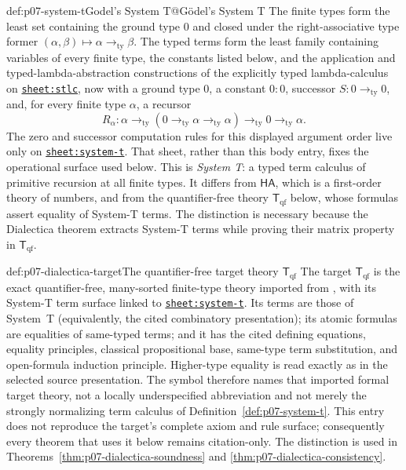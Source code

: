 \begin{hbdefinition}{def:p07-system-t}{Godel's System T@G\"odel's System T}
The finite types form the least set containing the ground type \(0\) and
closed under the right-associative type former
\((\alpha,\beta)\mapsto\alpha\to_{\mathrm{ty}}\beta\).  The typed terms form
the least family containing variables of every finite type, the constants
listed below, and the application and typed-lambda-abstraction constructions
of the explicitly typed lambda-calculus on
\hyperref[sheet:stlc]{\texttt{sheet:stlc}}, now with a ground type \(0\), a
constant \(0:0\), successor \(S:0\to_{\mathrm{ty}}0\), and, for every finite type
\(\alpha\), a recursor
\[
 R_\alpha:
 \alpha\to_{\mathrm{ty}}
 (0\to_{\mathrm{ty}}\alpha\to_{\mathrm{ty}}\alpha)
 \to_{\mathrm{ty}}0\to_{\mathrm{ty}}\alpha.
\]
The zero and successor computation rules for this displayed argument order
live only on \hyperref[sheet:system-t]{\texttt{sheet:system-t}}.  That sheet,
rather than this body entry, fixes the operational surface used below.
This is \emph{System T}: a typed term calculus of primitive recursion at all
finite types.  It differs from \(\mathsf{HA}\), which is a first-order theory
of numbers, and from the quantifier-free theory \(\mathsf T_{\mathrm{qf}}\)
below, whose
formulas assert equality of System-T terms.  The distinction is necessary
because the Dialectica theorem extracts System-T terms while proving their
matrix property in \(\mathsf T_{\mathrm{qf}}\).
\end{hbdefinition}

\begin{hbdefinition}{def:p07-dialectica-target}{The quantifier-free target theory \(\mathsf T_{\mathrm{qf}}\)}
The target \(\mathsf T_{\mathrm{qf}}\) is the exact quantifier-free,
many-sorted finite-type
theory imported from \cite[Section~2.2]{AvigadFeferman1998}, with its System-T
term surface linked to \hyperref[sheet:system-t]{\texttt{sheet:system-t}}.  Its
terms are those of System~T (equivalently, the cited combinatory presentation);
its atomic formulas are equalities of same-typed terms; and it has the cited
defining equations, equality principles, classical propositional base,
same-type term substitution, and open-formula induction principle.
Higher-type equality is read exactly as in the selected source presentation.
The symbol therefore names that imported formal target theory, not a locally
underspecified abbreviation and not merely the strongly normalizing term
calculus of Definition~\ref{def:p07-system-t}.  This entry does not reproduce
the target's complete axiom and rule surface; consequently every theorem that
uses it below remains citation-only.  The distinction is used in
Theorems~\ref{thm:p07-dialectica-soundness} and
\ref{thm:p07-dialectica-consistency}.
\end{hbdefinition}

